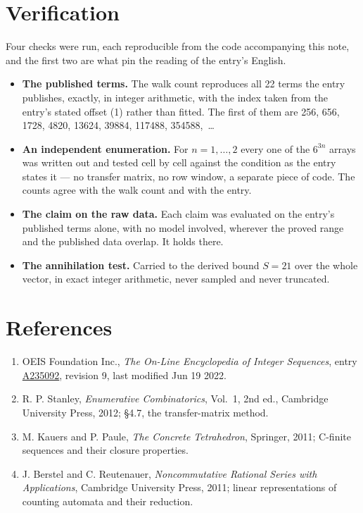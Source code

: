 \documentclass[11pt]{article}
\theoremstyle{definition}
\begin{document}
\section{Verification}

Four checks were run, each reproducible from the code accompanying this note, and the first two are what pin the reading of the entry's English.

\begin{itemize}

\item {\bfseries The published terms.} The walk count reproduces all 22 terms the entry publishes, exactly, in integer arithmetic, with the index taken from the entry's stated offset (1) rather than fitted. The first of them are 256, 656, 1728, 4820, 13624, 39884, 117488, 354588,~\dots

\item {\bfseries An independent enumeration.} For $n = 1,\dots,2$ every one of the $6^{3n}$ arrays was written out and tested cell by cell against the condition as the entry states it --- no transfer matrix, no row window, a separate piece of code. The counts agree with the walk count and with the entry.

\item {\bfseries The claim on the raw data.} Each claim was evaluated on the entry's published terms alone, with no model involved, wherever the proved range and the published data overlap. It holds there.

\item {\bfseries The annihilation test.} Carried to the derived bound $S = 21$ over the whole vector, in exact integer arithmetic, never sampled and never truncated.

\end{itemize}

\section{References}

\begin{enumerate}

\item OEIS Foundation Inc., \emph{The On-Line Encyclopedia of Integer Sequences}, entry \href{https://oeis.org/A235092}{A235092}, revision 9, last modified Jun 19 2022.

\item R. P. Stanley, \emph{Enumerative Combinatorics}, Vol.~1, 2nd ed., Cambridge University Press, 2012; \S4.7, the transfer-matrix method.

\item M. Kauers and P. Paule, \emph{The Concrete Tetrahedron}, Springer, 2011; C-finite sequences and their closure properties.

\item J. Berstel and C. Reutenauer, \emph{Noncommutative Rational Series with Applications}, Cambridge University Press, 2011; linear representations of counting automata and their reduction.

\end{enumerate}
\end{document}
